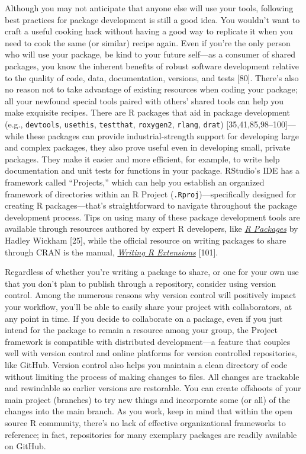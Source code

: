 \documentclass[10pt,letterpaper]{article}
\begin{document}
Although you may not anticipate that anyone else will use your tools,
following best practices for package development is still a good idea.
You wouldn't want to craft a useful cooking hack without having a good
way to replicate it when you need to cook the same (or similar) recipe
again. Even if you're the only person who will use your package, be kind
to your future self---as a consumer of shared packages, you know the
inherent benefits of robust software development relative to the quality
of code, data, documentation, versions, and tests {[}80{]}. There's also
no reason not to take advantage of existing resources when coding your
package; all your newfound special tools paired with others' shared
tools can help you make exquisite recipes. There are R packages that aid
in package development (e.g., \texttt{devtools}, \texttt{usethis},
\texttt{testthat}, \texttt{roxygen2}, \texttt{rlang}, \texttt{drat})
{[}35,41,85,98--100{]}---while these packages can provide
industrial-strength support for developing large and complex packages,
they also prove useful even in developing small, private packages. They
make it easier and more efficient, for example, to write help
documentation and unit tests for functions in your package. RStudio's
IDE has a framework called ``Projects,'' which can help you establish an
organized framework of directories within an R Project
(\texttt{.Rproj})---specifically designed for creating R
packages---that's straightforward to navigate throughout the package
development process. Tips on using many of these package development
tools are available through resources authored by expert R developers,
like \href{https://r-pkgs.org/}{\emph{R Packages}} by Hadley Wickham
{[}25{]}, while the official resource on writing packages to share
through CRAN is the manual,
\href{https://cran.r-project.org/doc/manuals/r-release/R-exts.html}{\emph{Writing
R Extensions}} {[}101{]}.

Regardless of whether you're writing a package to share, or one for your
own use that you don't plan to publish through a repository, consider
using version control. Among the numerous reasons why version control
will positively impact your workflow, you'll be able to easily share
your project with collaborators, at any point in time. If you decide to
collaborate on a package, even if you just intend for the package to
remain a resource among your group, the Project framework is compatible
with distributed development---a feature that couples well with version
control and online platforms for version controlled repositories, like
GitHub. Version control also helps you maintain a clean directory of
code without limiting the process of making changes to files. All
changes are trackable and rewindable so earlier versions are restorable.
You can create offshoots of your main project (branches) to try new
things and incorporate some (or all) of the changes into the main
branch. As you work, keep in mind that within the open source R
community, there's no lack of effective organizational frameworks to
reference; in fact, repositories for many exemplary packages are readily
available on GitHub.
\end{document}
